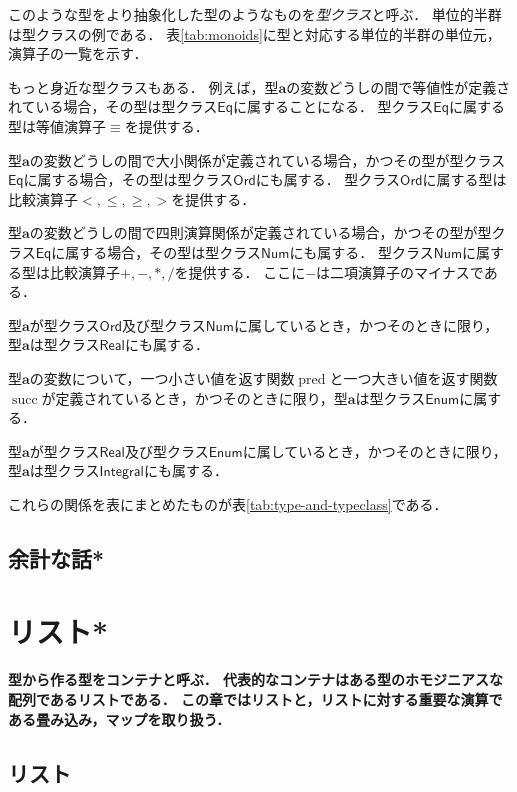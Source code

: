 \documentclass[twocolumn]{jsbook}
\newcommand{\keyword}[1]{\emph{#1}}
\newenvironment{leader}{\begingroup\bf}{\endgroup}
\newcommand{\hsklType}[1]{\textbf{#1}}
\newcommand{\hsklTypeclass}[1]{\mathsf{#1}}
\DeclareMathOperator{\hsklPred}{pred}
\DeclareMathOperator{\hsklSucc}{succ}
\newcommand{\hsklEnum}{\hsklTypeclass{Enum}}
\newcommand{\hsklIntegral}{\hsklTypeclass{Integral}}
\newcommand{\hsklEq}{\hsklTypeclass{Eq}}
\newcommand{\hsklNum}{\hsklTypeclass{Num}}
\newcommand{\hsklOrd}{\hsklTypeclass{Ord}}
\newcommand{\hsklReal}{\hsklTypeclass{Real}}
\begin{document}
このような型をより抽象化した型のようなものを\keyword{型クラス}と呼ぶ．
単位的半群は型クラスの例である．
表\ref{tab:monoids}に型と対応する単位的半群の単位元，演算子の一覧を示す．

もっと身近な型クラスもある．
例えば，型$\hsklType{a}$の変数どうしの間で等値性が定義されている場合，その型は型クラス$\hsklEq$に属することになる．
型クラス$\hsklEq$に属する型は等値演算子$\equiv$を提供する．

型$\hsklType{a}$の変数どうしの間で大小関係が定義されている場合，かつその型が型クラス$\hsklEq$に属する場合，その型は型クラス$\hsklOrd$にも属する．
型クラス$\hsklOrd$に属する型は比較演算子$<,\le,\ge,>$を提供する．

型$\hsklType{a}$の変数どうしの間で四則演算関係が定義されている場合，かつその型が型クラス$\hsklEq$に属する場合，その型は型クラス$\hsklNum$にも属する．
型クラス$\hsklNum$に属する型は比較演算子$+,-,*,/$を提供する．
ここに$-$は二項演算子のマイナスである．

型$\hsklType{a}$が型クラス$\hsklOrd$及び型クラス$\hsklNum$に属しているとき，かつそのときに限り，型$\hsklType{a}$は型クラス$\hsklReal$にも属する．

型$\hsklType{a}$の変数について，一つ小さい値を返す関数$\hsklPred$と一つ大きい値を返す関数$\hsklSucc$が定義されているとき，かつそのときに限り，型$\hsklType{a}$は型クラス$\hsklEnum$に属する．

型$\hsklType{a}$が型クラス$\hsklReal$及び型クラス$\hsklEnum$に属しているとき，かつそのときに限り，型$\hsklType{a}$は型クラス$\hsklIntegral$にも属する．

これらの関係を表にまとめたものが表\ref{tab:type-and-typeclass}である．



\section*{余計な話*}

\chapter{リスト*}

\begin{leader}
型から作る型をコンテナと呼ぶ．
代表的なコンテナはある型のホモジニアスな配列であるリストである．
この章ではリストと，リストに対する重要な演算である畳み込み，マップを取り扱う．
\end{leader}

\section{リスト}
\end{document}
